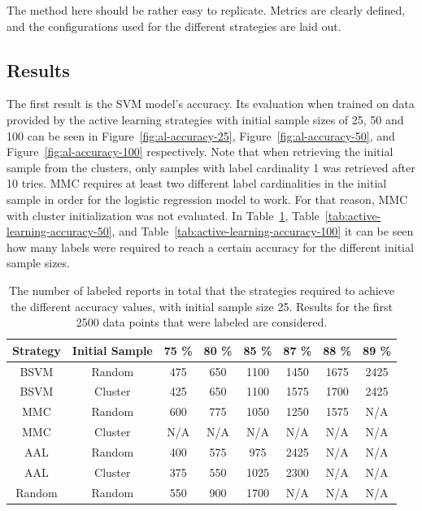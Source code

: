 The method here should be rather easy to replicate.
Metrics are clearly defined, and the configurations used for the different strategies are laid out.

\subsection{Results}
\label{sec:experiments-exp1-results}

The first result is the SVM model's accuracy.
Its evaluation when trained on data provided by the active learning strategies with initial sample sizes of 25, 50 and 100 can be seen in Figure~\ref{fig:al-accuracy-25}, Figure~\ref{fig:al-accuracy-50}, and Figure~\ref{fig:al-accuracy-100} respectively.
Note that when retrieving the initial sample from the clusters, only samples with label cardinality 1 was retrieved after 10 tries.
MMC requires at least two different label cardinalities in the initial sample in order for the logistic regression model to work.
For that reason, MMC with cluster initialization was not evaluated.
In Table~\ref{tab:active-learning-accuracy-25}, Table~\ref{tab:active-learning-accuracy-50}, and Table~\ref{tab:active-learning-accuracy-100} it can be seen how many labels were required to reach a certain accuracy for the different initial sample sizes.


\begin{table}
    \centering
    \begin{tabular}{|cccccccc|}
        \hline
        \textbf{Strategy} & \textbf{Initial Sample} & \textbf{75 \%} & \textbf{80 \%} & \textbf{85 \%} & \textbf{87 \%} & \textbf{88 \%} & \textbf{89 \%}\\
        \hline
        BSVM & Random & 475 & 650 & 1100 & 1450 & 1675 & 2425\\
        BSVM & Cluster & 425 & 650 & 1100 & 1575 & 1700 & 2425\\
        MMC & Random & 600 & 775 & 1050 & 1250 & 1575 & N/A\\
        MMC & Cluster & N/A & N/A & N/A & N/A & N/A & N/A\\
        AAL & Random & 400 & 575 & 975 & 2425 & N/A & N/A\\
        AAL & Cluster & 375 & 550 & 1025 & 2300 & N/A & N/A\\
        Random & Random & 550 & 900 & 1700 & N/A & N/A & N/A\\
        \hline
    \end{tabular}
    \caption{The number of labeled reports in total that the strategies required to achieve the different accuracy values, with initial sample size 25. Results for the first 2500 data points that were labeled are considered.}
    \label{tab:active-learning-accuracy-25}
\end{table}


